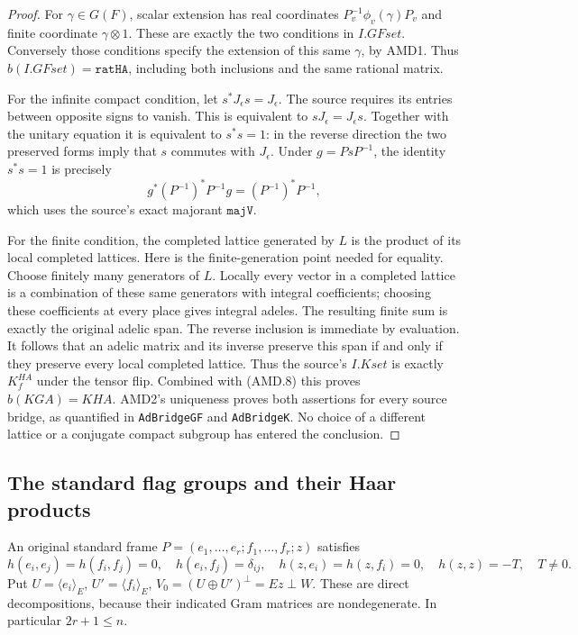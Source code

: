 \begin{proof}
For \(\gamma\in G(F)\), scalar extension has real coordinates
\(P_v^{-1}\phi_v(\gamma)P_v\) and finite coordinate
\(\gamma\otimes1\).  These are exactly the two conditions in
\(I.GFset\).  Conversely those conditions specify the extension
of this same \(\gamma\), by AMD1.  Thus
\(b(I.GFset)=\texttt{ratHA}\), including both inclusions and
the same rational matrix.

For the infinite compact condition, let \(s^*J_\epsilon s=J_\epsilon\).
The source requires its entries between opposite signs to vanish.
This is equivalent to \(sJ_\epsilon=J_\epsilon s\).  Together
with the unitary equation it is equivalent to \(s^*s=1\): in
the reverse direction the two preserved forms imply that \(s\)
commutes with \(J_\epsilon\).  Under \(g=PsP^{-1}\), the
identity \(s^*s=1\) is precisely
\[
 g^*(P^{-1})^*P^{-1}g=(P^{-1})^*P^{-1},
 \tag{AMD.8}
\]
which uses the source's exact majorant \(\texttt{majV}\).

For the finite condition, the completed lattice generated by
\(L\) is the product of its local completed lattices.  Here is
the finite-generation point needed for equality.  Choose finitely
many generators of \(L\).  Locally every vector in a completed
lattice is a combination of these same generators with integral
coefficients; choosing these coefficients at every place gives
integral adeles.  The resulting finite sum is exactly the original
adelic span.  The reverse inclusion is immediate by evaluation.
It follows that an adelic matrix and its inverse preserve this
span if and only if they preserve every local completed lattice.
Thus the source's \(I.Kset\) is exactly \(K_f^{HA}\) under
the tensor flip.  Combined with (AMD.8) this proves
\(b(KGA)=KHA\).  AMD2's uniqueness proves both assertions for
every source bridge, as quantified in \texttt{AdBridgeGF} and
\texttt{AdBridgeK}.  No choice of a different lattice or a
conjugate compact subgroup has entered the conclusion.
\end{proof}

\subsection{The standard flag groups and their Haar products}

An original standard frame \(P=(e_1,\ldots,e_r;
f_1,\ldots,f_r;z)\) satisfies
\[
 h(e_i,e_j)=h(f_i,f_j)=0,\quad h(e_i,f_j)=\delta_{ij},
 \quad h(z,e_i)=h(z,f_i)=0,\quad h(z,z)=-T,\quad T\ne0.
 \tag{AMD.9}
\]
Put \(U=\langle e_i\rangle_E\), \(U'=\langle f_i\rangle_E\),
\(V_0=(U\oplus U')^\perp=Ez\perp W\).  These are direct
decompositions, because their indicated Gram matrices are
nondegenerate.  In particular \(2r+1\le n\).

